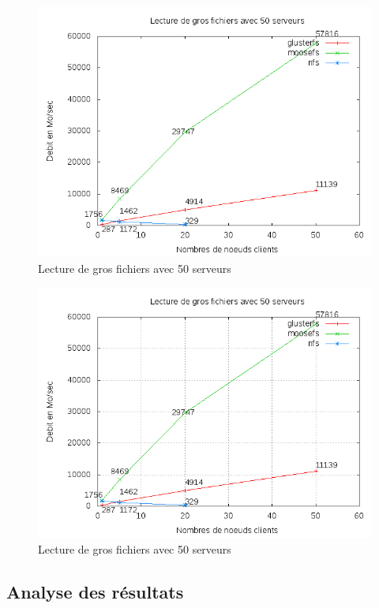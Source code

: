 \documentclass[12pt]{report}
\begin{document}
\begin{figure}[H]
\begin{center}
\includegraphics[bb=0 0 640 480,width=14cm]{images/srv50rb.png}
\caption{Lecture de gros fichiers avec 50 serveurs}
\end{center}
\end{figure} 
\begin{figure}[H]
\begin{center}
\includegraphics[bb=0 0 640 480,width=14cm]{images/srv50rb2.png}
\caption{Lecture de gros fichiers avec 50 serveurs}
\end{center}
\end{figure} 
			\subsection{Analyse des résultats}
\end{document}
